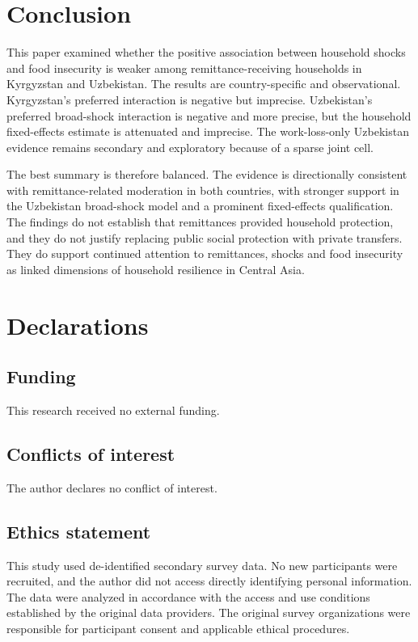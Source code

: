 \documentclass[11pt]{article}
\begin{document}
\section{Conclusion}

This paper examined whether the positive association between household shocks and food insecurity is weaker among remittance-receiving households in Kyrgyzstan and Uzbekistan. The results are country-specific and observational. Kyrgyzstan's preferred interaction is negative but imprecise. Uzbekistan's preferred broad-shock interaction is negative and more precise, but the household fixed-effects estimate is attenuated and imprecise. The work-loss-only Uzbekistan evidence remains secondary and exploratory because of a sparse joint cell.

The best summary is therefore balanced. The evidence is directionally consistent with remittance-related moderation in both countries, with stronger support in the Uzbekistan broad-shock model and a prominent fixed-effects qualification. The findings do not establish that remittances provided household protection, and they do not justify replacing public social protection with private transfers. They do support continued attention to remittances, shocks and food insecurity as linked dimensions of household resilience in Central Asia.

\section{Declarations}

\subsection*{Funding}
This research received no external funding.

\subsection*{Conflicts of interest}
The author declares no conflict of interest.

\subsection*{Ethics statement}
This study used de-identified secondary survey data. No new participants were recruited, and the author did not access directly identifying personal information. The data were analyzed in accordance with the access and use conditions established by the original data providers. The original survey organizations were responsible for participant consent and applicable ethical procedures.
\end{document}
